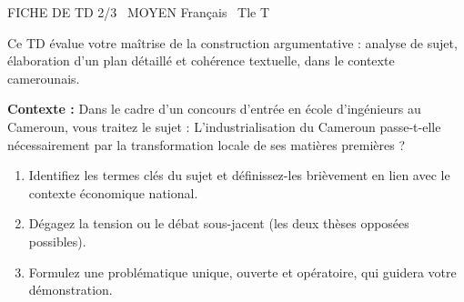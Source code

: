 \documentclass[11pt]{article}
\begin{document}
\begin{tcolorbox}[enhanced,colback=popink,colframe=popink,arc=10pt,boxrule=0pt,left=12pt,right=12pt,top=9pt,bottom=9pt]
{\color{white}\popxbold\small FICHE DE TD 2/3 \textbullet\ MOYEN \hfill Français \textbullet\ Tle T\par}
\end{tcolorbox}
\vspace{4pt}
Ce TD évalue votre maîtrise de la construction argumentative : analyse de sujet, élaboration d'un plan détaillé et cohérence textuelle, dans le contexte camerounais.

\begin{exercice}
\textbf{Contexte :} Dans le cadre d'un concours d'entrée en école d'ingénieurs au Cameroun, vous traitez le sujet : \og L'industrialisation du Cameroun passe-t-elle nécessairement par la transformation locale de ses matières premières ? \fg{}

\begin{enumerate}
    \item Identifiez les termes clés du sujet et définissez-les brièvement en lien avec le contexte économique national.
    \item Dégagez la tension ou le débat sous-jacent (les deux thèses opposées possibles).
    \item Formulez une problématique unique, ouverte et opératoire, qui guidera votre démonstration.
\end{enumerate}
\end{exercice}
\end{document}
